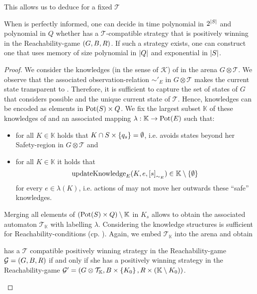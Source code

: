 This allows us to deduce for a fixed $\mathcal{T}$
\begin{theorem}
  When \adam{} is perfectly informed, one can decide in time polynomial in 
  $2^{\left\vert{S}\right\vert}$ and polynomial in $Q$ whether \eve{} has a 
  $\mathcal{T}$-compatible strategy that is positively winning in the 
  Reachability-game $\left(G, B, R\right)$. If such a strategy exists, one can 
  construct one that uses memory of size polynomial in $\left\vert{Q}\right\vert$ and 
  exponential in $\left\vert{S}\right\vert$.
\end{theorem}
\begin{proof}
  We consider the knowledges (in the sense of $\mathcal{K}$) of \eve{} in the
  arena $G\otimes\mathcal{T}$. We observe that the associated 
  observation-relation $\sim'_{E}$ in $G\otimes\mathcal{T}$ makes the current
  state transparent to \eve{}. Therefore, it is sufficient to capture the set
  of states of $G$ that \eve{} considers possible and the unique current state
  of $\mathcal{T}$. Hence, knowledges can be encoded as elements in 
  $\operatorname{Pot}(S)\times Q$. We fix the largest subset $\mathbb{K}$ of these knowledges 
  of \eve{} and an associated mapping $\lambda:\mathbb{K}\rightarrow\operatorname{Pot}(E)$ 
  such that:
  \begin{itemize}
    \item for all $K\in\mathbb{K}$ holds that $K\cap S\times\left\{q_{s}\right\} = 
      \emptyset$, i.e. \eve{} avoids states beyond her Safety-region in 
      $G\otimes\mathcal{T}$ and
    \item for all $K\in\mathbb{K}$ it holds that
      \begin{equation*}
        \operatorname{updateKnowledge}_{E}(K, e, \left[s\right]_{\sim_{E}})\in
          \mathbb{K}\setminus\left\{\emptyset\right\}
      \end{equation*}
      for every $e\in\lambda(K)$, i.e. actions of \eve{} may not move her 
      outwards these \enquote{safe} knowledges.
  \end{itemize}
  Merging all elements of $\left(\operatorname{Pot}(S)\times Q\right)\setminus\mathbb{K}$ in 
  $K_{s}$ allows to obtain the associated automaton $\mathcal{T}_{\mathbb{K}}$
  with labelling $\lambda$. Considering the knowledge structures is sufficient
  for Reachability-conditions (cp. \cite{AlgorithmsForPOSG}). Again, we embed 
  $\mathcal{T}_{\mathbb{K}}$ into the arena and obtain
  \begin{lemma}
    \eve{} has a $\mathcal{T}$ compatible positively winning strategy in the
    Reachability-game $\mathcal{G} = \left(G, B, R\right)$ if and only if she has a
    positively winning strategy in the Reachability-game $\mathcal{G'} = 
    \left(G\otimes\mathcal{T}_{\mathbb{K}}, B\times\left\{K_{0}\right\}, R\times 
    \left(\mathbb{K}\setminus K_{0}\right)\right)$. 


\end{lemma}
\end{proof}
